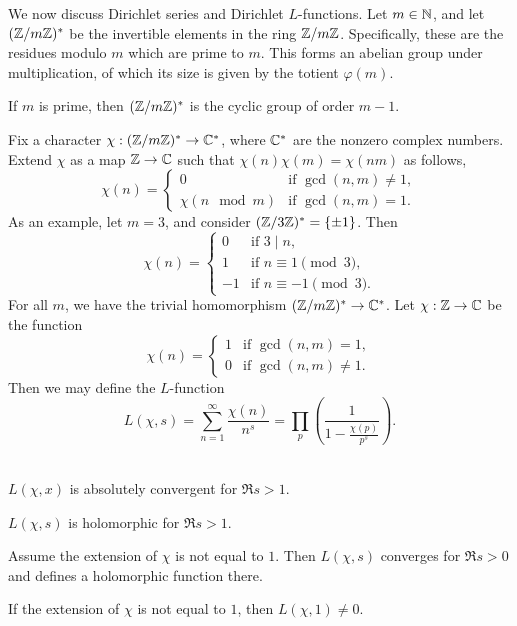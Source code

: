 \noindent We now discuss Dirichlet series and Dirichlet $L$-functions. Let $m \in \mathbb N$, and let $(\mathbb Z / m \mathbb Z)^\ast$ be the invertible elements in the ring $\mathbb Z / m \mathbb Z$. Specifically, these are the residues modulo $m$ which are prime to $m$. This forms an abelian group under multiplication, of which its size is given by the totient $\varphi(m)$.
\begin{exercise}
    If $m$ is prime, then $(\mathbb Z / m \mathbb Z)^\ast$ is the cyclic group of order $m - 1$.
\end{exercise}
\noindent Fix a character $\chi : (\mathbb Z / m \mathbb Z)^\ast \to \mathbb C^\ast$, where $\mathbb C^\ast$ are the nonzero complex numbers. Extend $\chi$ as a map $\mathbb Z \to \mathbb C$ such that $\chi(n) \chi(m) = \chi(nm)$ as follows,
\[ \chi(n) = \begin{cases} 0 & \text{if } \gcd(n, m) \neq 1, \\ \chi(n \mod m) & \text{if } \gcd(n, m) = 1. \end{cases} \]
As an example, let $m = 3$, and consider $(\mathbb Z / 3 \mathbb Z)^\ast = \{\pm 1\}$. Then
\[ \chi(n) = \begin{cases} 0 & \text{if } 3 \mid n, \\ 1 & \text{if } n \equiv 1 \pmod 3, \\ -1 & \text{if } n \equiv -1 \pmod 3. \end{cases} \]
For all $m$, we have the trivial homomorphism $(\mathbb Z / m \mathbb Z)^\ast \to \mathbb C^\ast$. Let $\chi : \mathbb Z \to \mathbb C$ be the function
\[ \chi(n) = \begin{cases} 1 & \text{if } \gcd(n, m) = 1, \\ 0 & \text{if } \gcd(n, m) \neq 1. \end{cases} \]
Then we may define the $L$-function
\[ L(\chi, s) = \sum_{n=1}^\infty \frac{\chi(n)}{n^s} = \prod_p \left(\frac{1}{1 - \frac{\chi(p)}{p^s}}\right). \]
\\[-24pt]
\begin{claim}
    $L(\chi, x)$ is absolutely convergent for $\Re s > 1$.
\end{claim}
\begin{theorem}
    \begin{parlist}
        \item $L(\chi, s)$ is holomorphic for $\Re s > 1$.
        \item Assume the extension of $\chi$ is not equal to $1$. Then $L(\chi, s)$ converges for $\Re s > 0$ and defines a holomorphic function there.
        \item If the extension of $\chi$ is not equal to $1$, then $L(\chi, 1) \neq 0$.
    \end{parlist}
\end{theorem}
